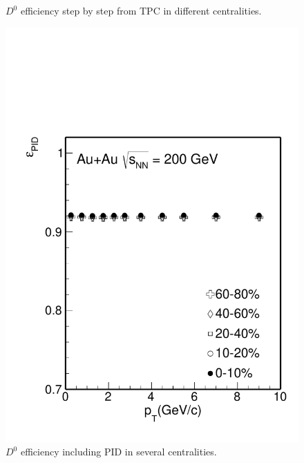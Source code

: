 \begin{figure}[htbp]
\begin{minipage}[htbp]{0.52\linewidth}
\caption{ $D^0$ efficiency step by step from TPC in different centralities. \label{D0effStep1}}
\end{minipage}
\hfill
\begin{minipage}[htbp]{0.52\linewidth}
\centering
\includegraphics[width=1.0\textwidth,angle=0]{figure/Run14_D0HFT/Datad0Eff_pid_10.pdf} 
\caption{ $D^0$ efficiency including PID in several centralities. \label{D0effStep2}}
\end{minipage}
\end{figure}

